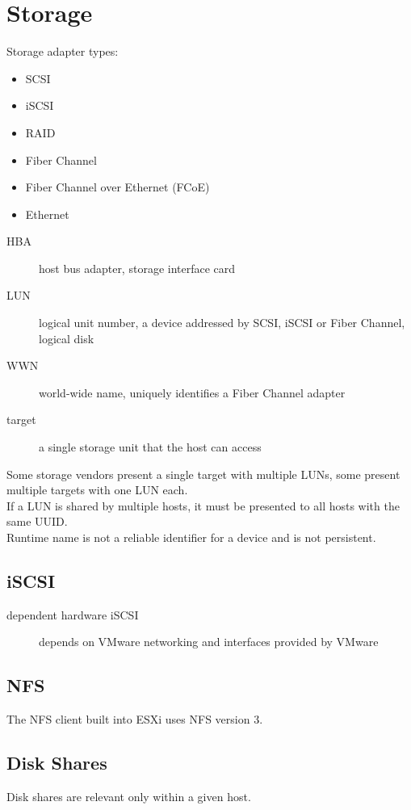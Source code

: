 \documentclass{article}
\begin{document}
\section{Storage}

Storage adapter types:

\begin{itemize}
\item SCSI
\item iSCSI
\item RAID
\item Fiber Channel
\item Fiber Channel over Ethernet (FCoE)
\item Ethernet
\end{itemize}

\begin{description}

  \item[HBA] host bus adapter, storage interface card

  \item [LUN] logical unit number, a device addressed by SCSI, iSCSI or Fiber
    Channel, logical disk

  \item[WWN] world-wide name, uniquely identifies a Fiber Channel adapter

  \item[target] a single storage unit that the host can access

\end{description}

Some storage vendors present a single target with multiple LUNs, some present
multiple targets with one LUN each.\\

If a LUN is shared by multiple hosts, it must be presented to all hosts with
the same UUID.\\

Runtime name is not a reliable identifier for a device and is not persistent.

\subsection{iSCSI}

\begin{description}
  \item[dependent hardware iSCSI] depends on VMware networking and interfaces
provided by VMware
\end{description}

\subsection{NFS}

The NFS client built into ESXi uses NFS version 3.

\subsection{Disk Shares}

Disk shares are relevant only within a given host.
\end{document}
